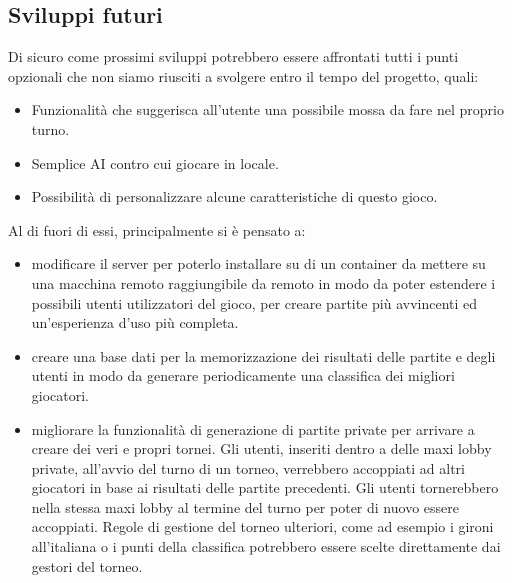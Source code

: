 \subsection{Sviluppi futuri}
Di sicuro come prossimi sviluppi potrebbero essere affrontati tutti i punti opzionali che non siamo riusciti a svolgere entro il tempo del progetto, quali:
\begin{itemize}
    \item Funzionalità che suggerisca all'utente una possibile mossa da fare nel proprio turno.
    \item Semplice AI contro cui giocare in locale.
    \item Possibilità di personalizzare alcune caratteristiche di questo gioco.
\end{itemize}
Al di fuori di essi, principalmente si è pensato a:
\begin{itemize}
    \item modificare il server per poterlo installare su di un container da mettere su una macchina remoto raggiungibile da remoto in modo da poter estendere i possibili utenti utilizzatori del gioco, per creare partite più avvincenti ed un’esperienza d’uso più completa.
    \item creare una base dati per la memorizzazione dei risultati delle partite e degli utenti in modo da generare periodicamente una classifica dei migliori giocatori.
    \item migliorare la funzionalità di generazione di partite private per arrivare a creare dei veri e propri tornei.
    Gli utenti, inseriti dentro a delle maxi lobby private, all’avvio del turno di un torneo, verrebbero accoppiati ad altri giocatori in base ai risultati delle partite precedenti.
    Gli utenti tornerebbero nella stessa maxi lobby al termine del turno per poter di nuovo essere accoppiati.
    Regole di gestione del torneo ulteriori, come ad esempio i gironi all’italiana o i punti della classifica potrebbero essere scelte direttamente dai gestori del torneo.
\end{itemize}

